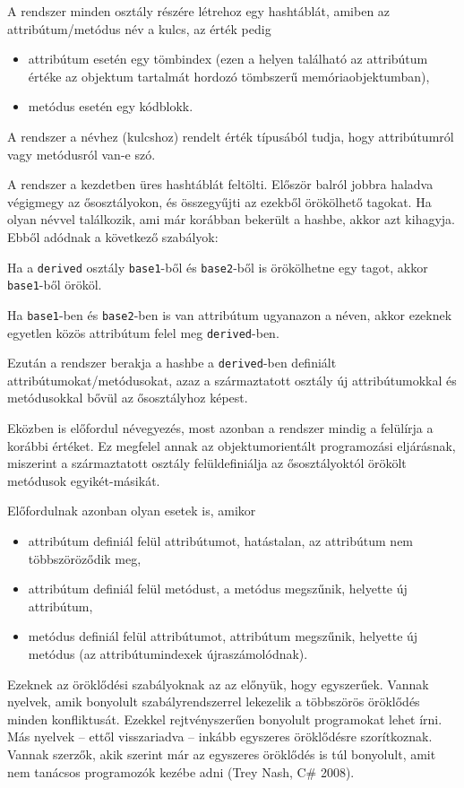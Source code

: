 A rendszer minden osztály részére létrehoz egy hashtáblát,
amiben az attribútum/metódus név a kulcs, az érték pedig
\begin{itemize}
 \item attribútum esetén egy tömbindex
       (ezen a helyen található az attribútum értéke az objektum 
       tartalmát hordozó tömbszerű memóriaobjektumban),
 \item metódus esetén egy kódblokk.
\end{itemize}
A rendszer a névhez (kulcshoz) rendelt érték típusából tudja,
hogy attribútumról vagy metódusról van-e szó.

A rendszer a kezdetben üres hashtáblát feltölti. 
Először balról jobbra haladva végigmegy az ősosztályokon,
és összegyűjti az ezekből örökölhető tagokat. Ha olyan névvel találkozik,
ami már korábban bekerült a hashbe, akkor azt kihagyja. Ebből adódnak
a következő szabályok:

Ha a \verb!derived! osztály \verb!base1!-ből és \verb!base2!-ből is
örökölhetne egy tagot, akkor \verb!base1!-ből örököl.

Ha \verb!base1!-ben és \verb!base2!-ben is van attribútum
ugyanazon a néven, akkor ezeknek egyetlen közös attribútum felel
meg \verb!derived!-ben.

Ezután a rendszer berakja a hashbe a \verb!derived!-ben definiált
attribútumokat/metódusokat, azaz a származtatott osztály új attribútumokkal
és metódusokkal bővül az ősosztályhoz képest.

Eközben is előfordul névegyezés, 
most azonban a rendszer mindig a felülírja a korábbi értéket. 
Ez megfelel annak az objektumorientált programozási eljárásnak,
miszerint a származtatott osztály felüldefiniálja az ősosztályoktól
örökölt metódusok egyikét-másikát.

Előfordulnak azonban olyan esetek is, amikor
\begin{itemize}
 \item 
    attribútum definiál felül attribútumot,
    hatástalan, az attribútum nem többszöröződik meg,
 \item
    attribútum definiál felül metódust,
    a metódus megszűnik, helyette új attribútum,
 \item
    metódus definiál felül attribútumot,
    attribútum megszűnik, helyette új metódus
    (az attribútumindexek újraszámolódnak).
\end{itemize}

Ezeknek az öröklődési szabályoknak az az előnyük, hogy egyszerűek.
Vannak nyelvek, amik bonyolult szabályrendszerrel lekezelik a többszörös 
öröklődés minden konfliktusát. Ezekkel rejtvényszerűen bonyolult
programokat lehet írni. Más nyelvek -- ettől visszariadva -- 
inkább egyszeres öröklődésre szorítkoznak.
Vannak szerzők, akik szerint már az egyszeres öröklődés is túl bonyolult,
amit nem tanácsos programozók kezébe adni (Trey Nash, C\# 2008).

